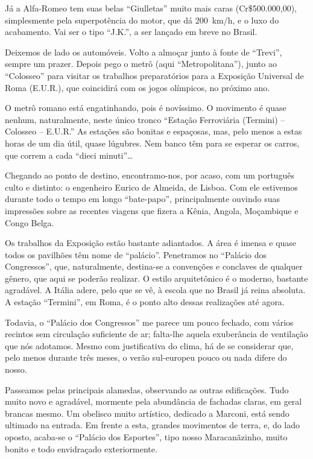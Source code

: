 Já a Alfa-Romeo tem suas belas ``Giulletas'' muito mais caras (Cr\$500.000,00), simplesmente pela superpotência do motor, que dá 200~km/h, e o luxo do acabamento. Vai ser o tipo ``J.K.'', a ser lançado em breve no Brasil.

Deixemos de lado os automóveis. Volto a almoçar junto à fonte de ``Trevi'', sempre um prazer. Depois pego o metrô (aqui ``Metropolitana''), junto ao ``Colosseo'' para visitar os trabalhos preparatórios para a Exposição Universal de Roma (E.U.R.), que coincidirá com os jogos olímpicos, no próximo ano.

O metrô romano está engatinhando, pois é novíssimo. O movimento é quase nenhum, naturalmente, neste único tronco ``Estação Ferroviária (Termini) -- Colosseo -- E.U.R.'' As estações são bonitas e espaçosas, mas, pelo menos a estas horas de um dia útil, quase lúgubres. Nem banco têm para se esperar os carros, que correm a cada ``dieci minuti''\ldots

Chegando ao ponto de destino, encontramo-nos, por acaso, com um português culto e distinto: o engenheiro Eurico de Almeida, de Lisboa. Com ele estivemos durante todo o tempo em longo ``bate-papo'', principalmente ouvindo suas impressões sobre as recentes viagens que fizera a Kênia, Angola, Moçambique e Congo Belga.

Os trabalhos da Exposição estão bastante adiantados. A área é imensa e quase todos os pavilhões têm nome de ``palácio''. Penetramos no ``Palácio dos Congressos'', que, naturalmente, destina-se a convenções e conclaves de qualquer gênero, que aqui se poderão realizar. O estilo arquitetônico é o moderno, bastante agradável. A Itália adere, pelo que se vê, à escola que no Brasil já reina absoluta. A estação ``Termini'', em Roma, é o ponto alto dessas realizações até agora.

Todavia, o ``Palácio dos Congressos'' me parece um pouco fechado, com vários recintos sem circulação suficiente de ar; falta-lhe aquela exuberância de ventilação que nós adotamos. Mesmo com justificativa do clima, há de se considerar que, pelo menos durante três meses, o verão sul-europeu pouco ou nada difere do nosso.

Passeamos pelas principais alamedas, observando as outras edificações. Tudo muito novo e agradável, mormente pela abundância de fachadas claras, em geral brancas mesmo. Um obelisco muito artístico, dedicado a Marconi, está sendo ultimado na entrada. Em frente a esta, grandes movimentos de terra, e, do lado oposto, acaba-se o ``Palácio dos Esportes'', tipo nosso Maracanãzinho, muito bonito e todo envidraçado exteriormente.

